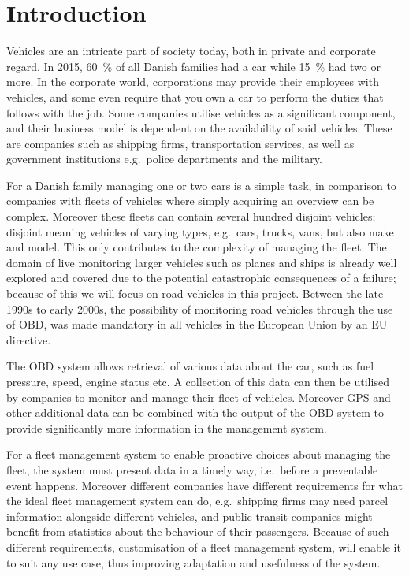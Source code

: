 \chapter{Introduction}
Vehicles are an intricate part of society today, both in private and corporate regard.
In 2015, 60~\% of all Danish families had a car while 15~\% had two or more\cite{MoreCarsInFamilies}.
In the corporate world, corporations may provide their employees with vehicles,
and some even require that you own a car to perform the duties that follows with the job.
Some companies utilise vehicles as a significant component,
and their business model is dependent on the availability of said vehicles.
These are companies such as shipping firms, transportation services,
as well as government institutions e.g.~police departments and the military.

\medskip
For a Danish family managing one or two cars is a simple task,
in comparison to companies with fleets of vehicles where simply acquiring an overview can be complex.
Moreover these fleets can contain several hundred disjoint vehicles;
disjoint meaning vehicles of varying types, e.g.~cars, trucks, vans, but also make and model.
This only contributes to the complexity of managing the fleet.
The domain of live monitoring larger vehicles such as planes and ships is already well explored and covered
due to the potential catastrophic consequences of a failure;
because of this we will focus on road vehicles in this project.
Between the late 1990s to early 2000s, the possibility of monitoring road vehicles through the use of \acl{OBD},
was made mandatory in all vehicles in the European Union by an EU directive\cite{EUDirective}.

The \ac{OBD} system allows retrieval of various data about the car, such as fuel pressure, speed, engine status etc.
A collection of this data can then be utilised by companies to monitor and manage their fleet of vehicles.
Moreover GPS and other additional data can be combined with the output of the \ac{OBD} system
to provide significantly more information in the management system.

\medskip
For a fleet management system to enable proactive choices about managing the fleet,
the system must present data in a timely way, i.e.~before a preventable event happens.
Moreover different companies have different requirements for what the ideal fleet management system can do,
e.g.~shipping firms may need parcel information alongside different vehicles,
and public transit companies might benefit from statistics about the behaviour of their passengers.
Because of such different requirements, customisation of a fleet management system,
will enable it to suit any use case, thus improving adaptation and usefulness of the system.

